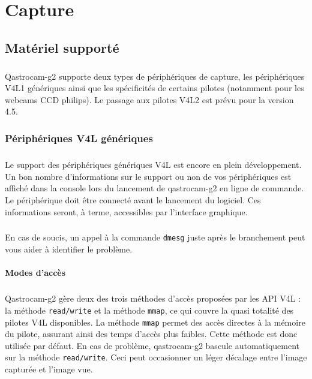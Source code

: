 \documentclass[11pt,a4paper]{book}
\begin{document}
\chapter{Capture}

\section{Mat\'eriel support\'e}

\paragraph*{}
Qastrocam-g2 supporte deux types de p\'eriph\'eriques de capture, les p\'eriph\'eriques V4L1 
g\'en\'eriques ainsi que les sp\'ecificit\'es de certains pilotes (notamment pour les webcams
CCD philips). Le passage aux pilotes V4L2 est pr\'evu pour la version 4.5.

\subsection{P\'eriph\'eriques V4L g\'en\'eriques}

\paragraph*{}
Le support des p\'eriph\'eriques g\'en\'eriques V4L est encore en plein d\'eveloppement. Un
bon nombre d'informations sur le support ou non de vos p\'eriph\'eriques est affich\'e dans
la console lors du lancement de qastrocam-g2 en ligne de commande. Le p\'eriph\'erique doit
 \^etre  connect\'e avant le lancement du logiciel. Ces informations seront, \`a terme, 
 accessibles par l'interface graphique.

\paragraph*{} 
En cas de soucis, un  appel \`a la commande
 {\tt dmesg} juste apr\`es le branchement peut vous aider \`a identifier le probl\`eme. 

\subsubsection{Modes d'acc\`es}

\paragraph*{}
Qastrocam-g2 g\`ere deux des trois m\'ethodes d'acc\`es propos\'ees par les API V4L : la m\'ethode
{\tt read/write} et la m\'ethode {\tt mmap}, ce qui couvre la quasi totalit\'e des pilotes V4L
disponibles. La m\'ethode {\tt mmap} permet des acc\`es directes \`a la m\'emoire du pilote,
assurant ainsi des temps d'acc\`es plus faibles. Cette m\'ethode est donc utilis\'ee par d\'efaut.
En cas de probl\`eme, qastrocam-g2 bascule automatiquement sur la m\'ethode {\tt read/write}. Ceci
peut occasionner un l\'eger d\'ecalage entre l'image captur\'ee et l'image vue. 
\end{document}
